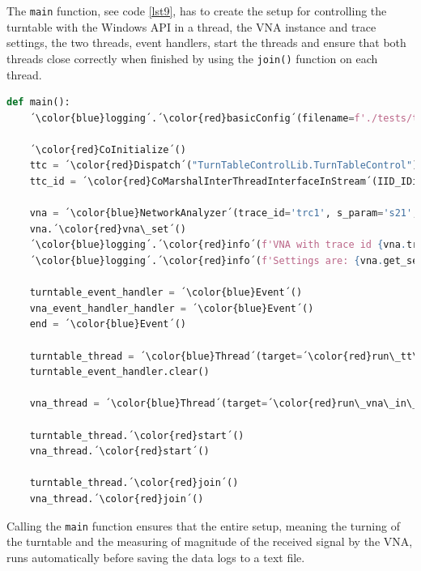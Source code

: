The \verb+main+ function, see code \ref{lst9}, has to create the setup for controlling the turntable with the Windows API in a thread, the VNA instance and trace settings, the two threads, event handlers, start the threads and ensure that both threads close correctly when finished by using the \verb+join()+ function on each thread. 
\begin{lstlisting}[language=Python, caption=Main function.]
def main():
    ´\color{blue}logging´.´\color{red}basicConfig´(filename=f'./tests/test-{time.strftime("%Y%m%d-%H%M")}-log.txt', filemode='a', format="%(asctime)s:%(name)s: %(message)s", level=logging.INFO, datefmt="%Y-%m-%d %H:%M:%S")
    
    ´\color{red}CoInitialize´()
    ttc = ´\color{red}Dispatch´("TurnTableControlLib.TurnTableControl")
    ttc_id = ´\color{red}CoMarshalInterThreadInterfaceInStream´(IID_IDispatch, ttc)

    vna = ´\color{blue}NetworkAnalyzer´(trace_id='trc1', s_param='s21', freq=5.65)
    vna.´\color{red}vna\_set´()
    ´\color{blue}logging´.´\color{red}info´(f'VNA with trace id {vna.trace_id} is created. Measuring {vna.s_param}.')
    ´\color{blue}logging´.´\color{red}info´(f'Settings are: {vna.get_settings()}')

    turntable_event_handler = ´\color{blue}Event´()
    vna_event_handler_handler = ´\color{blue}Event´()
    end = ´\color{blue}Event´()

    turntable_thread = ´\color{blue}Thread´(target=´\color{red}run\_tt\_in\_thread´, kwargs={'ttc_id': ttc_id, 'ttc': ttc, 'turntable_event_handler': turntable_event_handler, 'vna_event_handler': vna_event_handler_handler, 'end': end})
    turntable_event_handler.clear()

    vna_thread = ´\color{blue}Thread´(target=´\color{red}run\_vna\_in\_thread´, kwargs={'vna': vna, 'turntable_event_handler': turntable_event_handler, 'vna_event_handler': vna_event_handler_handler, 'end': end})
    
    turntable_thread.´\color{red}start´()
    vna_thread.´\color{red}start´()

    turntable_thread.´\color{red}join´()
    vna_thread.´\color{red}join´()
\end{lstlisting} \label{lst9}
Calling the \verb+main+ function ensures that the entire setup, meaning the turning of the turntable and the measuring of magnitude of the received signal by the VNA, runs automatically before saving the data logs to a text file.